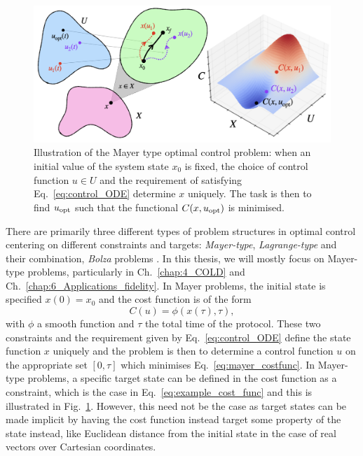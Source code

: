 \begin{figure}[t]
\centering
\includegraphics[width=0.9\linewidth]{images/optimal_control_illustration.png} \caption[Illustration of optimal control problem structure]{Illustration of the Mayer type optimal control problem: when an initial value of the system state $x_0$ is fixed, the choice of control function $u \in U$ and the requirement of satisfying Eq.~\eqref{eq:control_ODE} determine $x$ uniquely. The task is then to find $u_{\rm opt}$ such that the functional $C(x, u_{\rm opt})$ is minimised.}\label{fig:optimal_control}
\end{figure}

There are primarily three different types of problem structures in optimal control centering on different constraints and targets: \emph{Mayer-type}, \emph{Lagrange-type} and their combination, \emph{Bolza} problems \cite{dalessandro_introduction_2021}. In this thesis, we will mostly focus on Mayer-type problems, particularly in Ch.~\ref{chap:4_COLD} and Ch.~\ref{chap:6_Applications_fidelity}. In Mayer problems, the initial state is specified $x(0) = x_0$ and the cost function is of the form
\begin{equation}\label{eq:mayer_costfunc}
    C(u) = \phi(x(\tau), \tau),
\end{equation}
with $\phi$ a smooth function and $\tau$ the total time of the protocol. These two constraints and the requirement given by Eq.~\eqref{eq:control_ODE} define the state function $x$ uniquely and the problem is then to determine a control function $u$ on the appropriate set $[0, \tau]$ which minimises Eq.~\eqref{eq:mayer_costfunc}. In Mayer-type problems, a specific target state can be defined in the cost function as a constraint, which is the case in Eq.~\eqref{eq:example_cost_func} and this is illustrated in Fig.~\ref{fig:optimal_control}. However, this need not be the case as target states can be made implicit by having the cost function instead target some property of the state instead, like Euclidean distance from the initial state in the case of real vectors over Cartesian coordinates. 

